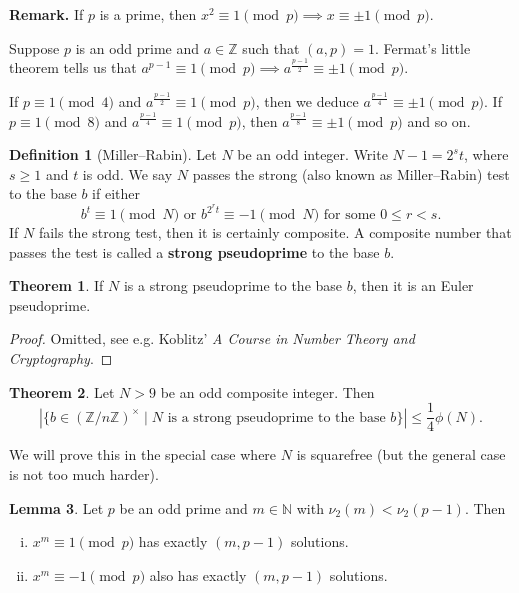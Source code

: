 \documentclass{article}
\theoremstyle{definition}
\newtheorem{theorem}{Theorem}[section]
\newtheorem{lemma}[theorem]{Lemma}
\newtheorem{defn}{Definition}[section]
\begin{document}
\textbf{Remark.} If $p$ is a prime, then $x^2 \equiv 1\pmod{p} \implies x \equiv \pm 1 \pmod{p}$.
\vspace{1mm}

Suppose $p$ is an odd prime and $a \in \mathbb{Z}$ such that $(a,p)=1$. Fermat's little theorem tells us that $a^{p-1} \equiv 1\pmod{p} \implies a^{\frac{p-1}{2}} \equiv \pm 1\pmod{p}$.
\vspace{1mm}

If $p\equiv 1\pmod{4}$ and $a^{\frac{p-1}{2}} \equiv 1 \pmod{p}$, then we deduce $a^{\frac{p-1}{4}} \equiv \pm 1\pmod{p}$. If $p\equiv 1\pmod{8}$ and $a^{\frac{p-1}{4}} \equiv 1\pmod{p}$, then $a^{\frac{p-1}{8}}\equiv \pm 1\pmod{p}$ and so on.

\begin{defn}[Miller--Rabin]
    Let $N$ be an odd integer. Write $N-1=2^s t$, where $s\ge 1$ and $t$ is odd. We say $N$ passes the strong (also known as Miller--Rabin) test to the base $b$ if either \[
    b^t \equiv 1\pmod{N} \text{ or } b^{2^rt}\equiv -1\pmod{N}\text{ for some }0\le r<s.
    \] 
    If $N$ fails the strong test, then it is certainly composite. A composite number that passes the test is called a \textbf{strong pseudoprime} to the base $b$.
\end{defn}
\begin{theorem}\label{7.5}
    If $N$ is a strong pseudoprime to the base $b$, then it is an Euler pseudoprime.
\end{theorem}
\begin{proof}
    Omitted, see e.g. Koblitz' \textit{A Course in Number Theory and Cryptography}. 
\end{proof}
\begin{theorem}\label{7.6}
    Let $N>9$ be an odd composite integer. Then \[
    |\{b \in (\mathbb{Z}/n\mathbb{Z})^\times \mid N\text{ is a strong pseudoprime to the base }b\}| \le \frac{1}{4}\phi(N).
    \]
\end{theorem}
We will prove this in the special case where $N$ is squarefree (but the general case is not too much harder).
\begin{lemma}
    Let $p$ be an odd prime and $m \in \mathbb{N}$ with $\nu_2(m)<\nu_2(p-1)$. Then
    \begin{enumerate}[(i)]
        \item $x^m \equiv 1\pmod{p}$ has exactly $(m,p-1)$ solutions.
        \item $x^m \equiv -1\pmod{p}$ also has exactly $(m,p-1)$ solutions.
    \end{enumerate}
\end{lemma}
\end{document}
